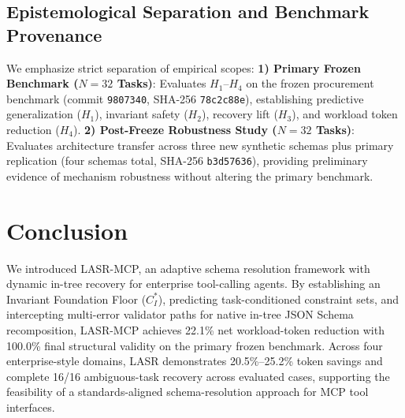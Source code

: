 \subsection{Epistemological Separation and Benchmark Provenance}
We emphasize strict separation of empirical scopes: \textbf{1) Primary Frozen Benchmark ($N=32$ Tasks)}: Evaluates $H_1$--$H_4$ on the frozen procurement benchmark (commit \texttt{9807340}, SHA-256 \texttt{78c2c88e}), establishing predictive generalization ($H_1$), invariant safety ($H_2$), recovery lift ($H_3$), and workload token reduction ($H_4$). \textbf{2) Post-Freeze Robustness Study ($N=32$ Tasks)}: Evaluates architecture transfer across three new synthetic schemas plus primary replication (four schemas total, SHA-256 \texttt{b3d57636}), providing preliminary evidence of mechanism robustness without altering the primary benchmark.

\section{Conclusion}
\label{sec:conclusion}
We introduced LASR-MCP, an adaptive schema resolution framework with dynamic in-tree recovery for enterprise tool-calling agents. By establishing an Invariant Foundation Floor ($C_I^*$), predicting task-conditioned constraint sets, and intercepting multi-error validator paths for native in-tree JSON Schema recomposition, LASR-MCP achieves 22.1\% net workload-token reduction with 100.0\% final structural validity on the primary frozen benchmark. Across four enterprise-style domains, LASR demonstrates 20.5\%--25.2\% token savings and complete 16/16 ambiguous-task recovery across evaluated cases, supporting the feasibility of a standards-aligned schema-resolution approach for MCP tool interfaces.


